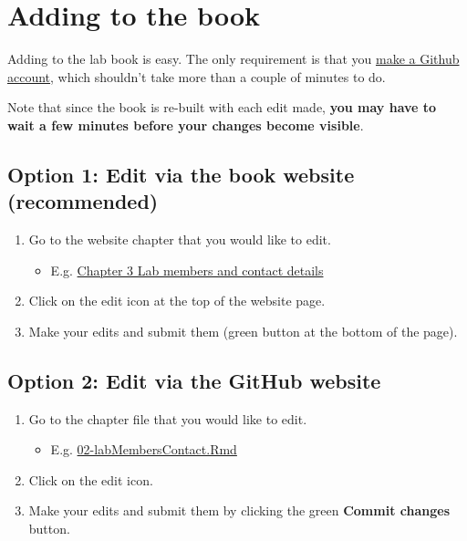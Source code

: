 \documentclass[
]{book}
\providecommand{\tightlist}{%
  \setlength{\itemsep}{0pt}\setlength{\parskip}{0pt}}
\begin{document}
\hypertarget{adding-to-the-book}{%
\section{Adding to the book}\label{adding-to-the-book}}

Adding to the lab book is easy. The only requirement is that you \href{https://github.com/join?source=header-home}{make a Github account}, which shouldn't take more than a couple of minutes to do.

Note that since the book is re-built with each edit made, \textbf{you may have to wait a few minutes before your changes become visible}.

\hypertarget{option-1-edit-via-the-book-website-recommended}{%
\subsection{Option 1: Edit via the book website (recommended)}\label{option-1-edit-via-the-book-website-recommended}}

\begin{enumerate}
\def\labelenumi{\arabic{enumi}.}
\tightlist
\item
  Go to the website chapter that you would like to edit.

  \begin{itemize}
  \tightlist
  \item
    E.g. \href{https://tiroshlab.github.io/lab-book/contact.html}{Chapter 3 Lab members and contact details}
  \end{itemize}
\item
  Click on the edit icon at the top of the website page.
\item
  Make your edits and submit them (green button at the bottom of the page).
\end{enumerate}

\hypertarget{option-2-edit-via-the-github-website}{%
\subsection{Option 2: Edit via the GitHub website}\label{option-2-edit-via-the-github-website}}

\begin{enumerate}
\def\labelenumi{\arabic{enumi}.}
\tightlist
\item
  Go to the chapter file that you would like to edit.

  \begin{itemize}
  \tightlist
  \item
    E.g. \href{https://github.com/tiroshlab/lab-book/blob/master/02-labMembersContact.Rmd}{02-labMembersContact.Rmd}
  \end{itemize}
\item
  Click on the edit icon.
\item
  Make your edits and submit them by clicking the green \textbf{Commit changes} button.
\end{enumerate}
\end{document}
